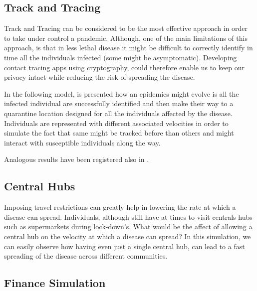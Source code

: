 \subsection{Track and Tracing}

Track and Tracing can be considered to be the most effective approach in order to take under control a pandemic. Although, one of the main limitations of this approach, is that in less lethal disease it might be difficult to correctly identify in time all the individuals infected (some might be asymptomatic). Developing contact tracing apps using cryptography, could therefore enable us to keep our privacy intact while reducing the risk of spreading the disease.

In the following model, is presented how an epidemics might evolve is all the infected individual are successfully identified and then make their way to a quarantine location designed for all the individuals affected by the disease. Individuals are represented with different associated velocities in order to simulate the fact that same might be tracked before than others and might interact with susceptible individuals along the way.

Analogous results have been registered also in \cite{epic}.

\subsection{Central Hubs}

Imposing travel restrictions can greatly help in lowering the rate at which a disease can spread. Individuals, although still have at times to visit centrals hubs such as supermarkets during lock-down's. What would be the affect of allowing a central hub on the velocity at which a disease can spread? In this simulation, we can easily observe how having even just a single central hub, can lead to a fast spreading of the disease across different communities.

\subsection{Finance Simulation}


